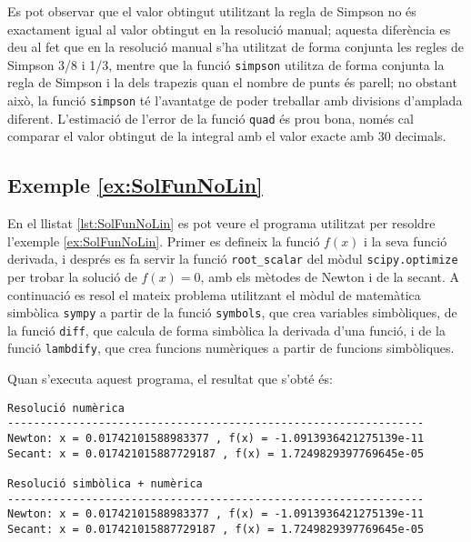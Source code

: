 Es pot observar que el valor obtingut utilitzant la regla de Simpson no és exactament igual al valor obtingut en la resolució manual; aquesta diferència es deu  al fet que en la resolució manual s'ha utilitzat de forma conjunta les regles de Simpson 3/8 i 1/3, mentre que la funció \texttt{simpson}  utilitza de forma conjunta la regla de Simpson i la dels trapezis quan el nombre de punts és parell; no obstant això, la funció \texttt{simpson} té l'avantatge de poder treballar amb divisions d'amplada diferent. L'estimació de l'error de la funció \texttt{quad} és prou bona, només cal comparar el valor obtingut de la integral  amb el valor exacte amb 30 decimals.


\hypertarget{exemple:SolFunNoLin}{\subsection{Exemple \ref*{ex:SolFunNoLin} \SolFunNoLin}}
En el llistat \vref{lst:SolFunNoLin} es pot veure el programa utilitzat per resoldre l'exemple \vref{ex:SolFunNoLin}. Primer es defineix la funció $f(x)$ i la seva funció derivada, i després es fa servir la funció \texttt{root\_scalar}  del mòdul \texttt{scipy.optimize} per trobar la solució de $f(x)=0$, amb els mètodes de Newton i de la secant. A continuació es resol el mateix problema utilitzant el mòdul  de matemàtica simbòlica \texttt{sympy} a partir de la funció \texttt{symbols}, que crea variables simbòliques, de la funció \texttt{diff}, que calcula de forma simbòlica la derivada d'una funció, i de la funció  \texttt{lambdify}, que crea funcions numèriques a partir de funcions simbòliques.




Quan s'executa aquest programa, el resultat que s'obté és:
\lstset{
	language=,
	numbers=none,
	frame=none
}
\begin{lstlisting}
Resolució numèrica
----------------------------------------------------------------
Newton: x = 0.01742101588983377 , f(x) = -1.0913936421275139e-11
Secant: x = 0.017421015887729187 , f(x) = 1.7249829397769645e-05

Resolució simbòlica + numèrica
----------------------------------------------------------------
Newton: x = 0.01742101588983377 , f(x) = -1.0913936421275139e-11
Secant: x = 0.017421015887729187 , f(x) = 1.7249829397769645e-05
\end{lstlisting} 
